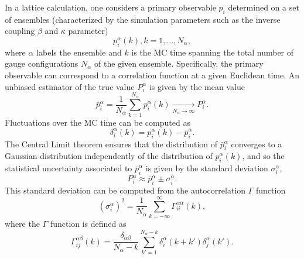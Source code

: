 In a lattice calculation, one considers a primary observable $p_i$ determined on a set of ensembles (characterized by the simulation parameters such as the inverse coupling $\beta$ and $\kappa$ parameter) 
\begin{equation}
p_i^{\alpha}(k), k=1,...,N_{\alpha},
\end{equation}
where $\alpha$ labels the ensemble and $k$ is the MC time spanning the total number of gauge configurations $N_{\alpha}$ of the given ensemble. Specifically, the primary observable can correspond to  a correlation function at a given Euclidean time. An unbiased estimator of the true value $P_i^{\alpha}$ is given by the mean value
\begin{equation}
\bar{p}_i^{\alpha}=\frac{1}{N_{\alpha}}\sum_{k=1}^{N_{\alpha}}p_i^{\alpha}(k)\xrightarrow[N_{\alpha}\rightarrow\infty]{}P_i^{\alpha}.
\end{equation}
Fluctuations over the MC time can be computed as
\begin{equation}
\delta_i^{\alpha}(k)=p_i^{\alpha}(k)-\bar{p}_i^{\alpha}.
\end{equation}
The Central Limit theorem ensures that the distribution of $\bar{p}_i^{\alpha}$ converges to a Gaussian distribution independently of the distribution of $p_i^{\alpha}(k)$, and so the statistical uncertainty associated to $\bar{p}_i^{\alpha}$ is given by the standard deviation $\sigma_i^{\alpha}$,
\begin{equation}
P_i^{\alpha}\approx\bar{p}_i^{\alpha}\pm\sigma_i^{\alpha}.
\end{equation}
This standard deviation can be computed from the autocorrelation $\Gamma$ function
\begin{equation}
(\sigma_i^{\alpha})^2=\frac{1}{N_{\alpha}}\sum_{k=-\infty}^{\infty}\Gamma_{ii}^{\alpha\alpha}(k),
\end{equation}
where the $\Gamma$ function is defined as
\begin{equation}
\Gamma_{ij}^{\alpha\beta}(k)=\frac{\delta_{\alpha\beta}}{N_{\alpha}-k}\sum_{k'=1}^{N_{\alpha}-k}\delta_i^{\alpha}(k+k')\delta_j^{\alpha}(k').
\end{equation}

